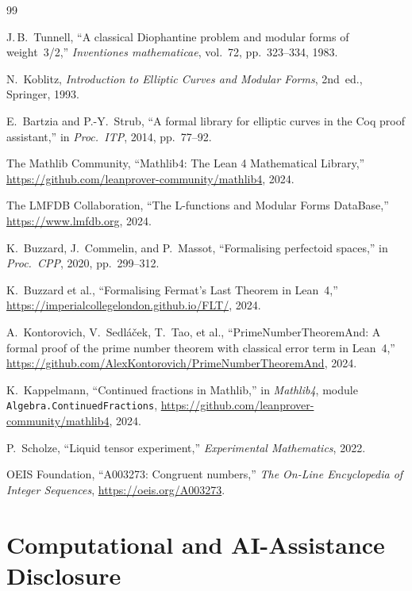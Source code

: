 \documentclass[11pt,a4paper]{article}
\theoremstyle{definition}
\begin{document}

\begin{thebibliography}{99}

J.\,B.~Tunnell,
``A classical Diophantine problem and modular forms of weight~3/2,''
\emph{Inventiones mathematicae}, vol.~72, pp.~323--334, 1983.

N.~Koblitz,
\emph{Introduction to Elliptic Curves and Modular Forms},
2nd~ed., Springer, 1993.

E.~Bartzia and P.-Y.~Strub,
``A formal library for elliptic curves in the Coq proof assistant,''
in \emph{Proc.\ ITP}, 2014, pp.~77--92.

The Mathlib Community,
``Mathlib4: The Lean 4 Mathematical Library,''
\url{https://github.com/leanprover-community/mathlib4}, 2024.

The LMFDB Collaboration,
``The L-functions and Modular Forms DataBase,''
\url{https://www.lmfdb.org}, 2024.

K.~Buzzard, J.~Commelin, and P.~Massot,
``Formalising perfectoid spaces,''
in \emph{Proc.\ CPP}, 2020, pp.~299--312.

K.~Buzzard et al.,
``Formalising Fermat's Last Theorem in Lean~4,''
\url{https://imperialcollegelondon.github.io/FLT/}, 2024.

A.~Kontorovich, V.~Sedl\'{a}\v{c}ek, T.~Tao, et al.,
``PrimeNumberTheoremAnd: A formal proof of the prime number
theorem with classical error term in Lean~4,''
\url{https://github.com/AlexKontorovich/PrimeNumberTheoremAnd},
2024.

K.~Kappelmann,
``Continued fractions in Mathlib,''
in \emph{Mathlib4}, module \texttt{Algebra.ContinuedFractions},
\url{https://github.com/leanprover-community/mathlib4}, 2024.

P.~Scholze,
``Liquid tensor experiment,''
\emph{Experimental Mathematics}, 2022.

OEIS Foundation,
``A003273: Congruent numbers,''
\emph{The On-Line Encyclopedia of Integer Sequences},
\url{https://oeis.org/A003273}.

\end{thebibliography}

\section*{Computational and AI-Assistance Disclosure}
\end{document}
